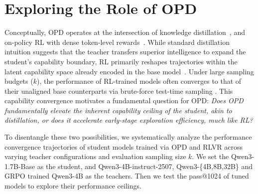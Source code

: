 \documentclass[11pt]{article}
\begin{document}


  
\section{Exploring the Role of OPD}\label{sec:role}
Conceptually, OPD operates at the intersection of knowledge distillation~\cite{hinton2015distillingknowledgeneuralnetwork,gu2026minillmonpolicydistillationlarge}, and on-policy RL with dense token-level rewards~\cite{gopd}. 
While standard distillation intuition suggests that the teacher transfers superior intelligence to expand the student's capability boundary, RL primarily reshapes trajectories within the latent capability space already encoded in the base model~\cite{reasoning-bound,RL-no-up}.  
Under large sampling budgets ($k$), the performance of RL-trained models often converges to that of their unaligned base counterparts via brute-force test-time sampling \citep{RL-no-up}. 
This capability convergence motivates a fundamental question for OPD: \textit{Does OPD fundamentally elevate the inherent capability ceiling of the student, akin to distillation, or does it accelerate early-stage exploration efficiency, much like RL?}



To disentangle these two possibilities, we systematically analyze the performance convergence trajectories of student models trained via OPD and RLVR across varying teacher configurations and evaluation sampling size $k$.
We set the Qwen3-1.7B-Base as the student, and Qwen3-4B-instruct-2507, Qwen3-\{4B,8B,32B\} and GRPO trained Qwen3-4B as the teachers.
Then we test the pass@1024 of tuned models to explore their performance ceilings. 
\end{document}
